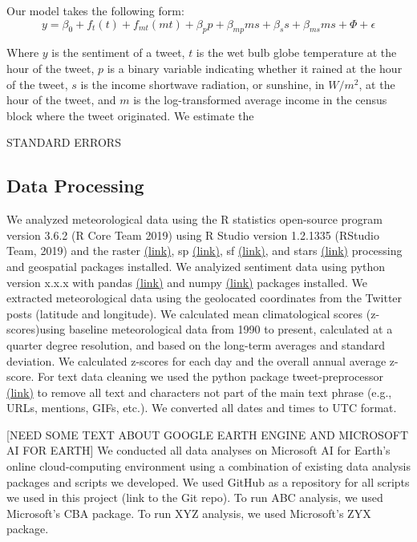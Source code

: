 \documentclass{article}
\begin{document}
Our model takes the following form:
\begin{equation}
    y = \beta_0 + f_t(t) + f_{mt}(m t) + \beta_p p + \beta_{mp} m s + \beta_s s + \beta_{ms} m s + \Phi + \epsilon
\end{equation}

Where $y$ is the sentiment of a tweet, $t$ is the wet bulb globe temperature at the hour of the tweet, $p$ is a binary variable indicating whether it rained at the hour of the tweet, $s$ is the income shortwave radiation, or sunshine, in $W/m^2$, at the hour of the tweet, and $m$ is the log-transformed average income in the census block where the tweet originated.  We estimate the 


STANDARD ERRORS


\subsection{Data Processing}
We analyzed meteorological data using the R statistics open-source program version 3.6.2  (R Core Team 2019) using R Studio version 1.2.1335 (RStudio Team, 2019) and the raster \href{https://www.rdocumentation.org/packages/raster/versions/3.3-13}{(link)}, sp \href{https://cran.r-project.org/web/packages/sp/index.html}{(link)}, sf \href{https://cran.r-project.org/web/packages/sf/index.html}{(link)}, and stars \href{https://cran.r-project.org/web/packages/stars/index.html}{(link)} processing and geospatial packages installed. We analyized sentiment data using python version x.x.x with pandas \href{https://pandas.pydata.org/}{(link)} and numpy \href{https://numpy.org/}{(link)} packages installed. We extracted meteorological data using the geolocated coordinates from the Twitter posts (latitude and longitude). We calculated mean climatological scores (z-scores)using baseline meteorological data from 1990 to present, calculated at a quarter degree resolution, and based on the long-term averages and standard deviation. We calculated z-scores for each day and the overall annual average z-score. For text data cleaning we used the python package tweet-preprocessor \href{https://pypi.org/project/tweet-preprocessor/}{(link)} to remove all text and characters not part of the main text phrase (e.g., URLs, mentions, GIFs, etc.). We converted all dates and times to UTC format.

[NEED SOME TEXT ABOUT GOOGLE EARTH ENGINE AND MICROSOFT AI FOR EARTH] We conducted all data analyses on Microsoft AI for Earth's online cloud-computing environment using a combination of existing data analysis packages and scripts we developed. We used GitHub as a repository for all scripts we used in this project (link to the Git repo). To run ABC analysis, we used Microsoft's CBA package. To run XYZ analysis, we used Microsoft's ZYX package. 
\end{document}
